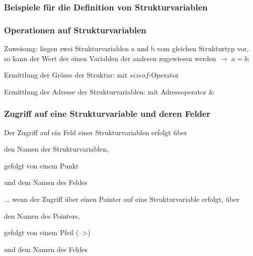 		\subsubsection{Beispiele für die Definition von Strukturvariablen}
			\vspace*{-0.2cm}
			
		\vspace*{0.3cm}		
		\subsubsection{Operationen auf Strukturvariablen}
			\begin{compactitem}
				\item Zuweisung: liegen zwei Strukturvariablen a und b vom gleichen Strukturtyp vor, so kann der Wert der einen Variablen der anderen zugewiesen werden $\rightarrow$ $a=b;$
				\item Ermittlung der Grösse der Struktur: mit $sizeof$-Operator
				\item Ermittlung der Adresse der Strukturvariablen: mit Adressoperator $\&$
			\end{compactitem}
		\subsubsection{Zugriff auf eine Strukturvariable und deren Felder}
			Der Zugriff auf ein Feld einer Strukturvariablen erfolgt über
			\begin{compactitem}
				\item den Namen der Strukturvariablen,
				\item gefolgt von einem Punkt
				\item und dem Namen des Feldes 
			\end{compactitem}			
			\vspace*{0.2cm}
			... wenn der Zugriff über einen Pointer auf eine Strukturvariable erfolgt, über
			\begin{compactitem}
				\item den Namen des Pointers,
				\item gefolgt von einem Pfeil (--\textgreater)
				\item und dem Namen des Feldes 
			\end{compactitem}
		\newpage				
